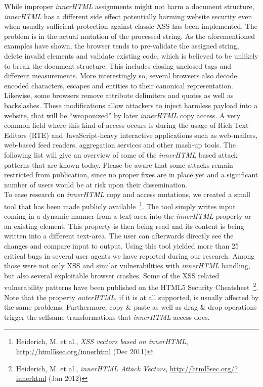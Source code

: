     While improper \textit{innerHTML} assignments might not harm a document structure, \textit{innerHTML} has a different side effect potentially harming website security even when usually sufficient protection against classic XSS has been implemented. The problem is in the actual mutation of the processed string. As the aforementioned examples have shown, the browser tends to pre-validate the assigned string, delete invalid elements and validate existing code, which is believed to be unlikely to break the document structure. This includes closing unclosed tags and different measurements. More interestingly so, several browsers also decode encoded characters, escapes and entities to their canonical representation. Likewise, some browsers remove attribute delimiters and quotes as well as backslashes. These modifications allow attackers to inject harmless payload into a website, that will be ``weaponized'' by later \textit{innerHTML} copy access. A very common field where this kind of access occurs is during 
the usage of Rich Text Editors (RTE) and JavaScript-heavy interactive applications such as web-mailers, web-based feed readers, aggregation services and other mash-up tools. The following list will give an overview of some of the \textit{innerHTML} based attack patterns that are known today. Please be aware that some attacks remain restricted from publication, since no proper fixes are in place yet and a significant number of users would be at risk upon their dissemination.\\

    To ease research on \textit{innerHTML} copy and access mutations, we created a small tool that has been made publicly available~\footnote{Heiderich, M. et al., \textit{XSS vectors based on innerHTML}, \url{http://html5sec.org/innerhtml} (Dec 2011)}. The tool simply writes input coming in a dynamic manner from a text-area into the \textit{innerHTML} property or an existing element. This property is then being read and its content is being written into a different text-area. The user can afterwards directly see the changes and compare input to output. Using this tool yielded more than 25 critical bugs in several user agents we have reported during our research. Among those were not only XSS and similar vulnerabilities with \textit{innerHTML} handling, but also several exploitable browser crashes. Some of the XSS related vulnerability patterns have been published on the HTML5 Security Cheatsheet~\footnote{Heiderich, M. et al., \textit{innerHTML Attack Vectors}, \url{http://html5sec.org/?innerhtml} (Jan 2012)
}. Note that the property \textit{outerHTML}, if it is at all supported, is usually affected by the same problems. Furthermore, copy \& paste as well as drag \& drop operations trigger the selfsame transformations that \textit{innerHTML} access does.

